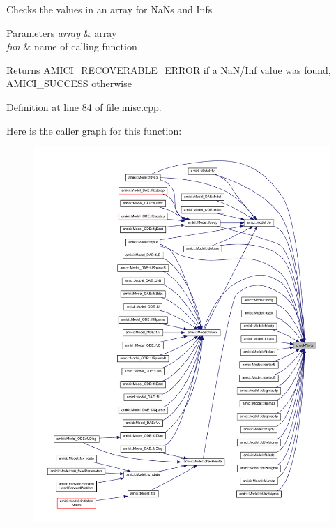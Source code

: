 Checks the values in an array for Na\+Ns and Infs


\begin{DoxyParams}{Parameters}
{\em array} & array \\
\hline
{\em fun} & name of calling function \\
\hline
\end{DoxyParams}
\begin{DoxyReturn}{Returns}
A\+M\+I\+C\+I\+\_\+\+R\+E\+C\+O\+V\+E\+R\+A\+B\+L\+E\+\_\+\+E\+R\+R\+OR if a Na\+N/\+Inf value was found, A\+M\+I\+C\+I\+\_\+\+S\+U\+C\+C\+E\+SS otherwise 
\end{DoxyReturn}


Definition at line 84 of file misc.\+cpp.

Here is the caller graph for this function\+:
\nopagebreak
\begin{figure}[H]
\begin{center}
\leavevmode
\includegraphics[width=350pt]{namespaceamici_a1c2cd160b1b5061e19257f2a7947c8ed_icgraph}
\end{center}
\end{figure}
\mbox{\label{namespaceamici_aeb0886d5a74ea04eeef52219063aa7d4}} 
